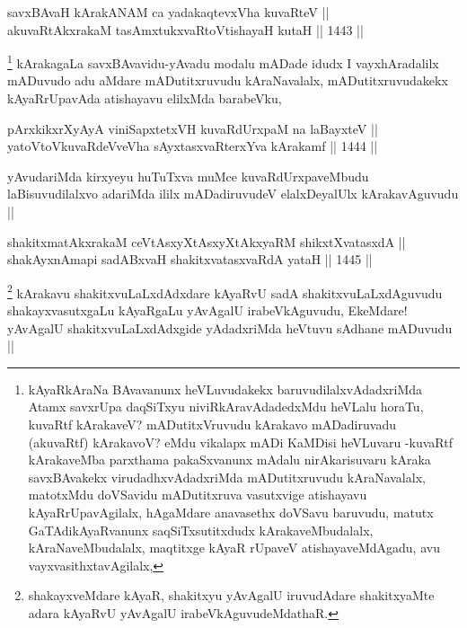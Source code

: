 
\begin{shl}
savxBAvaH kArakANAM ca yadakaqtevxVha kuvaRteV || \\
akuvaRtAkxrakaM tasAmxtukxvaRtoV\s tishayaH kutaH ||  1443 ||  
\end{shl}

\begin{artha}
\footnote{kAyaRkAraNa  BAvavanunx heVLuvudakekx baruvudilalxvAdadxriMda Atamx savxrUpa daqSiTxyu niviRkAravAdadedxMdu heVLalu horaTu, kuvaRtf kArakaveV? mADutitxVruvudu kArakavo mADadiruvadu (akuvaRtf) kArakavoV? eMdu vikalapx mADi KaMDisi heVLuvaru -kuvaRtf kArakaveMba parxthama pakaSxvanunx mAdalu nirAkarisuvaru kAraka savxBAvakekx virudadhxvAdadxriMda mADutitxruvudu kAraNavalalx, matotxMdu doVSavidu mADutitxruva vasutxvige atishayavu kAyaRrUpavAgilalx, hAgaMdare anavasethx doVSavu baruvudu, matutx GaTAdikAyaRvanunx saqSiTxsutitxdudx kArakaveMbudalalx, kAraNaveMbudalalx, maqtitxge kAyaR rUpaveV atishayaveMdAgadu, avu vayxvasithxtavAgilalx, }
kArakagaLa savxBAvavidu-yAvadu modalu mADade idudx I vayxhAradalilx mADuvudo adu aMdare mADutitxruvudu kAraNavalalx, mADutitxruvudakekx kAyaRrUpavAda atishayavu elilxMda barabeVku,
\end{artha}


\begin{shl}
pArxkikxrXyAyA viniSapxtetxVH kuvaRdUrxpaM na laBayxteV || \\
yatoV\s toV\s kuvaRdeVveVha sAyxtasxvaRterxYva kArakamf ||  1444 || 
\end{shl}

\begin{artha}
yAvudariMda kirxyeyu huTuTxva muMce kuvaRdUrxpaveMbudu laBisuvudilalxvo adariMda ililx mADadiruvudeV elalxDeyalUlx kArakavAguvudu ||
\end{artha}


\begin{shl}
shakitxmatAkxrakaM ceVtAsxyXtAsxyXtAkxyaRM shikxtXvatasxdA || \\
shakAyxnAmapi sadABxvaH shakitxvatasxvaRdA yataH ||  1445 || 
\end{shl}

\begin{artha}
\footnote{shakayxveMdare kAyaR, shakitxyu yAvAgalU iruvudAdare shakitxyaMte adara kAyaRvU yAvAgalU irabeVkAguvudeMdathaR.}
kArakavu shakitxvuLaLxdAdxdare kAyaRvU sadA shakitxvuLaLxdAguvudu shakayxvasutxgaLu kAyaRgaLu yAvAgalU irabeVkAguvudu, EkeMdare! yAvAgalU shakitxvuLaLxdAdxgide yAdadxriMda heVtuvu sAdhane mADuvudu ||
\end{artha}

